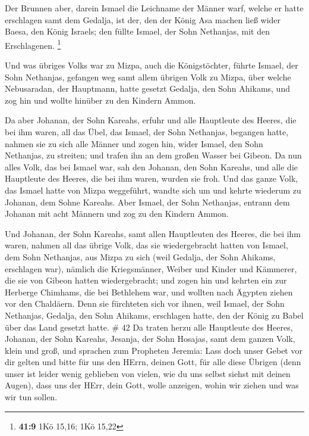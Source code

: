  Der Brunnen aber, darein Ismael die Leichname der Männer
warf, welche er hatte erschlagen samt dem Gedalja, ist der, den der
König Asa machen ließ wider Baesa, den König Israels; den füllte Ismael,
der Sohn Nethanjas, mit den Erschlagenen. \footnote{\textbf{41:9} 1Kö
  15,16; 1Kö 15,22}

 Und was übriges Volks war zu Mizpa, auch die
Königstöchter, führte Ismael, der Sohn Nethanjas, gefangen weg samt
allem übrigen Volk zu Mizpa, über welche Nebusaradan, der Hauptmann,
hatte gesetzt Gedalja, den Sohn Ahikams, und zog hin und wollte hinüber
zu den Kindern Ammon.

 Da aber Johanan, der Sohn Kareahs, erfuhr und alle
Hauptleute des Heeres, die bei ihm waren, all das Übel, das Ismael, der
Sohn Nethanjas, begangen hatte,  nahmen sie zu sich alle
Männer und zogen hin, wider Ismael, den Sohn Nethanjas, zu streiten; und
trafen ihn an dem großen Wasser bei Gibeon.  Da nun alles
Volk, das bei Ismael war, sah den Johanan, den Sohn Kareahs, und alle
die Hauptleute des Heeres, die bei ihm waren, wurden sie froh.
 Und das ganze Volk, das Ismael hatte von Mizpa weggeführt,
wandte sich um und kehrte wiederum zu Johanan, dem Sohne Kareahs.
 Aber Ismael, der Sohn Nethanjas, entrann dem Johanan mit
acht Männern und zog zu den Kindern Ammon.

 Und Johanan, der Sohn Kareahs, samt allen Hauptleuten des
Heeres, die bei ihm waren, nahmen all das übrige Volk, das sie
wiedergebracht hatten von Ismael, dem Sohn Nethanjas, aus Mizpa zu sich
(weil Gedalja, der Sohn Ahikams, erschlagen war), nämlich die
Kriegsmänner, Weiber und Kinder und Kämmerer, die sie von Gibeon hatten
wiedergebracht;  und zogen hin und kehrten ein zur Herberge
Chimhams, die bei Bethlehem war, und wollten nach Ägypten ziehen vor den
Chaldäern.  Denn sie fürchteten sich vor ihnen, weil
Ismael, der Sohn Nethanjas, Gedalja, den Sohn Ahikams, erschlagen hatte,
den der König zu Babel über das Land gesetzt hatte. \# 42 
Da traten herzu alle Hauptleute des Heeres, Johanan, der Sohn Kareahs,
Jesanja, der Sohn Hosajas, samt dem ganzen Volk, klein und groß,
 und sprachen zum Propheten Jeremia: Lass doch unser Gebet
vor dir gelten und bitte für uns den HErrn, deinen Gott, für alle diese
Übrigen (denn unser ist leider wenig geblieben von vielen, wie du uns
selbst siehst mit deinen Augen),  dass uns der HErr, dein
Gott, wolle anzeigen, wohin wir ziehen und was wir tun sollen.

